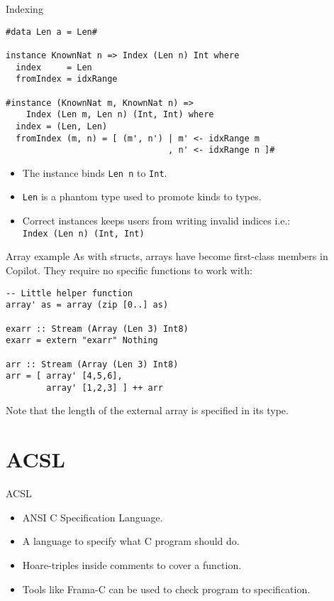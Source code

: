 \documentclass{beamer}
\begin{document}
\begin{frame}[fragile]{Indexing}
\begin{lstlisting}[basicstyle=\small]
#data Len a = Len#

instance KnownNat n => Index (Len n) Int where
  index     = Len
  fromIndex = idxRange

#instance (KnownNat m, KnownNat n) =>
    Index (Len m, Len n) (Int, Int) where
  index = (Len, Len)
  fromIndex (m, n) = [ (m', n') | m' <- idxRange m
                                , n' <- idxRange n ]#
\end{lstlisting}
\begin{itemize}
  \item The instance binds \texttt{Len n} to \texttt{Int}.
  \item<2-> \texttt{Len} is a phantom type used to promote kinds to types.
  \item<3-> Correct instances keeps users from writing invalid indices i.e.:\\
    \texttt{Index (Len n) (Int, Int)}
\end{itemize}
\end{frame}

\begin{frame}[fragile]{Array example}
As with structs, arrays have become first-class members in Copilot. They
require no specific functions to work with:
\begin{lstlisting}
-- Little helper function
array' as = array (zip [0..] as)

exarr :: Stream (Array (Len 3) Int8)
exarr = extern "exarr" Nothing

arr :: Stream (Array (Len 3) Int8)
arr = [ array' [4,5,6],
        array' [1,2,3] ] ++ arr
\end{lstlisting}
Note that the length of the external array is specified in its type.
\end{frame}


\section{ACSL}
\begin{frame}{ACSL}
\begin{itemize}
  \item ANSI C Specification Language.
  \item A language to specify what C program should do.
  \item Hoare-triples inside comments to cover a function.
  \item Tools like Frama-C can be used to check program to specification.
\end{itemize}
\end{frame}
\end{document}
